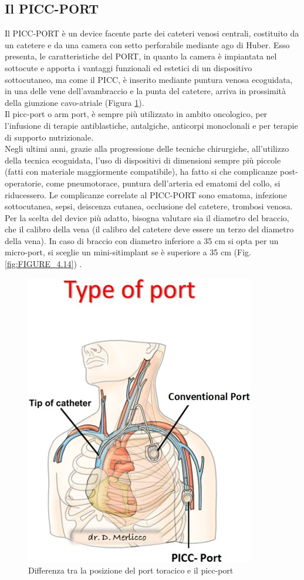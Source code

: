 \subsection{Il PICC-PORT}

Il PICC-PORT è un device facente parte dei cateteri venosi centrali, costituito da un catetere e da una camera con 
setto perforabile mediante ago di Huber. Esso presenta, le caratteristiche del PORT, in quanto la 
camera è impiantata nel sottocute e apporta i vantaggi funzionali ed estetici di un dispositivo sottocutaneo, 
ma come il PICC, è inserito mediante puntura venosa ecoguidata, in una delle vene dell'avambraccio\cite{MERLICCO}
e la punta del catetere, arriva in prossimità della giunzione cavo-atriale (Figura \ref{fig:FIGURE_4.8})\cite{CRO}.\\
Il picc-port o arm port, è sempre più utilizzato in ambito oncologico, per l'infusione di terapie antiblastiche, 
antalgiche, anticorpi monoclonali e per terapie di supporto nutrizionale\cite{GAVECELTPICCPORT}.\\
Negli ultimi anni, grazie alla progressione delle tecniche chirurgiche, all'utilizzo della tecnica ecoguidata, 
l'uso di dispositivi di dimensioni sempre più piccole (fatti con materiale maggiormente compatibile), ha fatto si che 
complicanze post-operatorie, come pneumotorace, puntura dell'arteria ed
ematomi del collo, si riducessero.
Le complicanze correlate al PICC-PORT sono ematoma, infezione sottocutanea, sepsi, deiscenza cutanea, occlusione del 
catetere, trombosi venosa.\\ 
Per la scelta del device più adatto, bisogna valutare sia il diametro del braccio, che il calibro della vena 
(il calibro del catetere deve essere un terzo del diametro della vena). In caso di braccio con diametro inferiore a 
35 cm si opta per un micro-port, si sceglie un mini-sitimplant se è superiore a 35 cm 
(Fig.\ref{fig:FIGURE_4.14}) \cite{GAVECELTPICCPORT}.

\begin{figure}[H]
    \begin{center}
    \includegraphics[width=0.3\columnwidth]{img/picc-port.jpg}
    \vspace{-3mm}
    \end{center}
    \caption{Differenza tra la posizione del port toracico e il picc-port
    \cite{MERLICCO}}
    \label{fig:FIGURE_4.8}
\end{figure}

